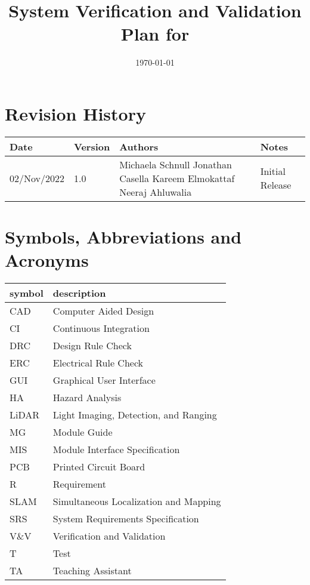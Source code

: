 \documentclass[12pt, titlepage]{article}
\begin{document}
\title{System Verification and Validation Plan for \progname{}} 
\author{\authname}
\date{\today}
	
\maketitle


\section{Revision History}

\begin{tabularx}{\textwidth}{p{3cm}p{2cm}p{4cm}X}
\toprule {\bf Date} & {\bf Version} & {\bf Authors} & {\bf Notes}\\
\midrule
02/Nov/2022 & 1.0 & Michaela Schnull \newline Jonathan Casella \newline Kareem Elmokattaf \newline Neeraj Ahluwalia & Initial Release\\
\bottomrule
\end{tabularx}

\newpage

\tableofcontents

\listoftables
{}

\newpage

\section{Symbols, Abbreviations and Acronyms}

\renewcommand{\arraystretch}{1.2}
\begin{tabular}{l l} 
  \toprule		
  \textbf{symbol} & \textbf{description}\\
  \midrule 
  CAD & Computer Aided Design\\
  CI & Continuous Integration\\
  DRC & Design Rule Check\\
  ERC & Electrical Rule Check\\
  GUI & Graphical User Interface\\
  HA & Hazard Analysis\\
  LiDAR & Light Imaging, Detection, and Ranging\\
  MG & Module Guide\\
  MIS & Module Interface Specification\\
  PCB & Printed Circuit Board\\
  R & Requirement \\
  SLAM & Simultaneous Localization and Mapping\\
  SRS & System Requirements Specification\\
  V\&V & Verification and Validation\\
  T & Test\\
  TA & Teaching Assistant\\
  \bottomrule
\end{tabular}\\
\end{document}
